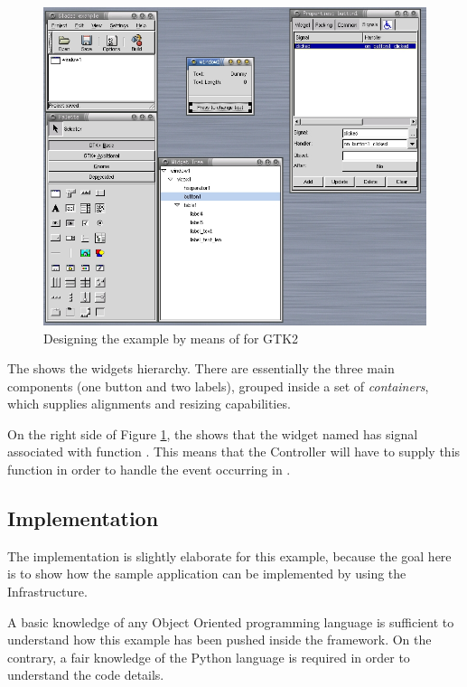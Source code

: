 \begin{figure}[here]
\begin{center}
\includegraphics[width=12cm]{figs/png/example_glade.png}
\caption{\label{GL:f}Designing the example by means of \glade for GTK2}
\end{center}
\end{figure}

The  shows the widgets hierarchy. There are
essentially the three main components (one button and two labels),
grouped inside a set of \emph{containers}, which supplies alignments and
resizing capabilities.

On the right side of Figure \ref{GL:f}, the 
shows that the widget named  has signal
 associated with function
. This means that the Controller will
have to supply this function in order to handle the 
event occurring in .

\subsection{Implementation}
The implementation is slightly elaborate for this example, because the
goal here is to show how the sample application can be implemented by
using the \mvco Infrastructure.

A basic knowledge of any Object Oriented programming language is
sufficient to understand how this example has been pushed inside the
\mvco framework. On the contrary, a fair knowledge of the Python
language is required in order to understand the code details.


